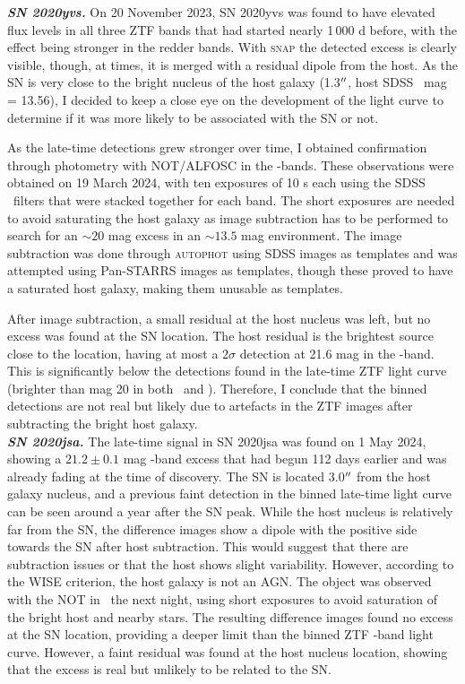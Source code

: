 \documentclass[a4paper,oneside,12pt, class=Latex/Classes/PhDthesisPSnPDF, crop=false]{standalone}
\begin{document}
\textit{\textbf{SN 2020yvs.}}
On 20 November 2023, SN 2020yvs was found to have elevated flux levels in all three ZTF bands that had started nearly 1\,000 d before, with the effect being stronger in the redder bands. With \textsc{snap} the detected excess is clearly visible, though, at times, it is merged with a residual dipole from the host. As the SN is very close to the bright nucleus of the host galaxy (1.3$^{\prime\prime}$, host SDSS \ztfr\ mag = 13.56), I decided to keep a close eye on the development of the light curve to determine if it was more likely to be associated with the SN or not.

As the late-time detections grew stronger over time, I obtained confirmation through photometry with NOT/ALFOSC in the \ztfg\ztfr\ztfi-bands. These observations were obtained on 19 March 2024, with ten exposures of 10 s each using the SDSS \ztfg\ztfr\ztfi\ filters that were stacked together for each band. The short exposures are needed to avoid saturating the host galaxy as image subtraction has to be performed to search for an $\sim 20$ mag excess in an $\sim 13.5$ mag environment. The image subtraction was done through \textsc{autophot} \citep{Autophot} using SDSS images as templates and was attempted using Pan-STARRS images as templates, though these proved to have a saturated host galaxy, making them unusable as templates.

After image subtraction, a small residual at the host nucleus was left, but no excess was found at the SN location. The host residual is the brightest source close to the location, having at most a $2\sigma$ detection at 21.6 mag in the \ztfi-band. This is significantly below the detections found in the late-time ZTF light curve (brighter than mag 20 in both \ztfr\ and \ztfi). Therefore, I conclude that the binned detections are not real but likely due to artefacts in the ZTF images after subtracting the bright host galaxy.\\


\textit{\textbf{SN 2020jsa.}}
The late-time signal in SN 2020jsa was found on 1 May 2024, showing a $21.2\pm0.1$ mag \ztfr-band excess that had begun 112 days earlier and was already fading at the time of discovery. The SN is located 3.0$^{\prime\prime}$ from the host galaxy nucleus, and a previous faint detection in the binned late-time light curve can be seen around a year after the SN peak. While the host nucleus is relatively far from the SN, the difference images show a dipole with the positive side towards the SN after host subtraction. This would suggest that there are subtraction issues or that the host shows slight variability. However, according to the WISE criterion, the host galaxy is not an AGN. The object was observed with the NOT in \ztfg\ztfr\ztfi\ the next night, using short exposures to avoid saturation of the bright host and nearby stars. The resulting difference images found no excess at the SN location, providing a deeper limit than the binned ZTF \ztfr-band light curve. However, a faint residual was found at the host nucleus location, showing that the excess is real but unlikely to be related to the SN.\\
\end{document}
